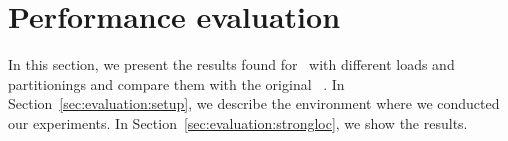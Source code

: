 \section{Performance evaluation}
\label{sec:experiments}

In this section, we present the results found for \appname\ with different loads and partitionings and compare them with the original \ssmr{}~\cite{bezerra2014ssmr}.
In Section~\ref{sec:evaluation:setup}, we describe the environment where we conducted our experiments.
In Section~\ref{sec:evaluation:strongloc}, we show the results.

